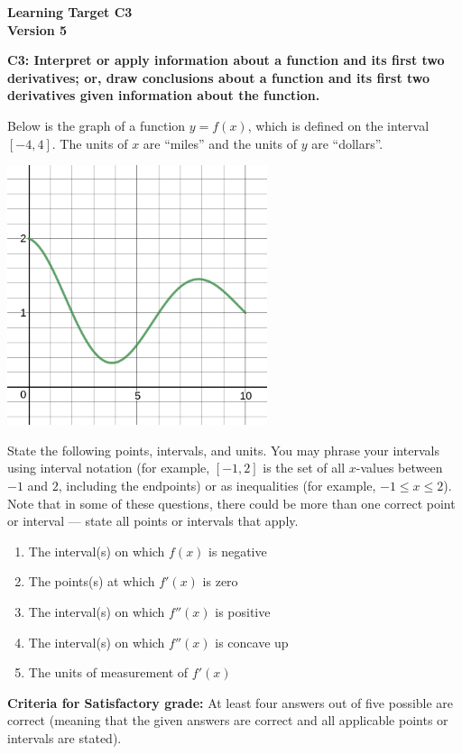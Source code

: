 \documentclass[10pt]{article}
\begin{document}
	\vspace*{0in}

		\begin{center}
			\textbf{Learning Target C3 \\
			Version 5} \\
		\end{center}


\begin{framed}
	\textbf{C3: Interpret or apply information about a function and its first two derivatives; or, draw conclusions about a function and its first two derivatives given information about the function. }
\end{framed}

Below is the graph of a function $y = f(x)$, which is defined on the interval $[-4,4]$. The units of $x$ are ``miles'' and the units of $y$ are ``dollars''. 
\begin{center}
    \includegraphics[width=3in]{ltc8-v2.png}
\end{center}
State the following points, intervals, and units. You may phrase your intervals using interval notation (for example, $[-1,2]$ is the set of all $x$-values between $-1$ and $2$, including the endpoints) or as inequalities (for example, $-1 \leq x \leq 2$). Note that in some of these questions, there could be more than one correct point or interval --- state all points or intervals that apply. 

\begin{enumerate}
    \item The interval(s) on which $f(x)$ is negative
    \item The points(s) at which $f'(x)$ is zero  
    \item The interval(s) on which $f''(x)$ is positive 
    \item The interval(s) on which $f''(x)$ is concave up
    \item The units of measurement of $f'(x)$
\end{enumerate}


\vfill


\begin{small}
    \begin{framed}
        	\textbf{Criteria for Satisfactory grade:} At least four answers out of five possible are correct (meaning that the given answers are correct and all applicable points or intervals are stated). 
    \end{framed}

\end{small}
\end{document}
